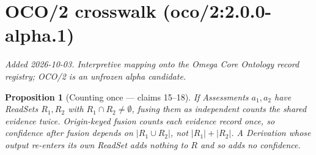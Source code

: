 \documentclass[11pt,a4paper]{article}
\newtheorem{proposition}[definition]{Proposition}
\begin{document}
\section{OCO/2 crosswalk (oco/2:2.0.0-alpha.1)}
\emph{Added 2026-10-03. Interpretive mapping onto the Omega Core Ontology
record registry; OCO/2 is an unfrozen alpha candidate.}

\begin{proposition}[Counting once --- claims 15--18]
If Assessments $a_1,a_2$ have ReadSets $R_1,R_2$ with $R_1\cap R_2\neq\emptyset$, fusing them as independent counts the shared evidence twice. Origin-keyed fusion counts each evidence record once, so confidence after fusion depends on $|R_1\cup R_2|$, not $|R_1|+|R_2|$. A Derivation whose output re-enters its own ReadSet adds nothing to $R$ and so adds no confidence.
\end{proposition}
\end{document}

